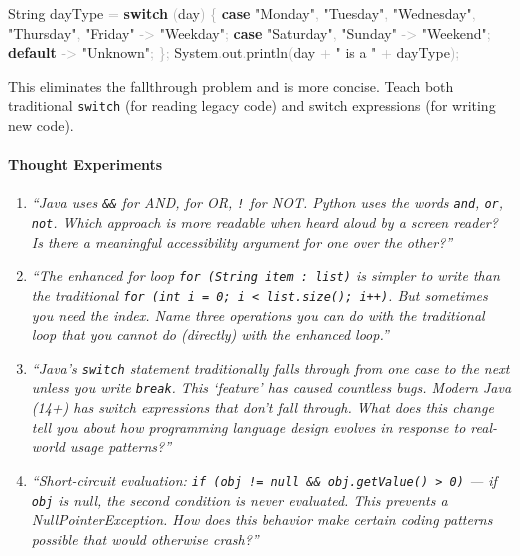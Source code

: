 \documentclass[
  justified,
  openright,
]{tufte-book}
\let\paragraph\paragraph
\newcommand{\KeywordTok}[1]{\textcolor{CodeKeyword}{\textbf{#1}}}  %
\newcommand{\StringTok}[1]{\textcolor{CodeString}{#1}}              %
\newcommand{\CodeFuncTok}[1]{\textcolor{CodeKeyword}{#1}}           %
\newcommand{\OperatorTok}[1]{\textcolor{DarkGray}{#1}}              %
\newenvironment{Shaded}{%
  \begin{mdframed}[style=TufteCode]%
}{%
  \end{mdframed}%
}
\let\paragraph\paragraph
\begin{document}
\begin{Shaded}
\begin{Highlighting}[]
String dayType \OperatorTok{=} \KeywordTok{switch} \OperatorTok{(}day\OperatorTok{)} \OperatorTok{\{}
    \KeywordTok{case} \StringTok{"Monday"}\OperatorTok{,} \StringTok{"Tuesday"}\OperatorTok{,} \StringTok{"Wednesday"}\OperatorTok{,} \StringTok{"Thursday"}\OperatorTok{,} \StringTok{"Friday"} \OperatorTok{{-}\textgreater{}} \StringTok{"Weekday"}\OperatorTok{;}
    \KeywordTok{case} \StringTok{"Saturday"}\OperatorTok{,} \StringTok{"Sunday"} \OperatorTok{{-}\textgreater{}} \StringTok{"Weekend"}\OperatorTok{;}
    \KeywordTok{default} \OperatorTok{{-}\textgreater{}} \StringTok{"Unknown"}\OperatorTok{;}
\OperatorTok{\};}
System\OperatorTok{.}\CodeFuncTok{out}\OperatorTok{.}\CodeFuncTok{println}\OperatorTok{(}day \OperatorTok{+} \StringTok{" is a "} \OperatorTok{+} dayType\OperatorTok{);}
\end{Highlighting}
\end{Shaded}

This eliminates the fallthrough problem and is more concise. Teach both
traditional \texttt{switch} (for reading legacy code) and switch
expressions (for writing new code).

\paragraph{Thought Experiments}\label{thought-experiments-34}

\begin{enumerate}
\def\labelenumi{\arabic{enumi}.}
\item
  \emph{``Java uses \texttt{\&\&} for AND, \texttt{\textbar{}\textbar{}}
  for OR, \texttt{!} for NOT. Python uses the words \texttt{and},
  \texttt{or}, \texttt{not}. Which approach is more readable when heard
  aloud by a screen reader? Is there a meaningful accessibility argument
  for one over the other?''}
\item
  \emph{``The enhanced for loop \texttt{for\ (String\ item\ :\ list)} is
  simpler to write than the traditional
  \texttt{for\ (int\ i\ =\ 0;\ i\ \textless{}\ list.size();\ i++)}. But
  sometimes you need the index. Name three operations you can do with
  the traditional loop that you cannot do (directly) with the enhanced
  loop.''}
\item
  \emph{``Java's \texttt{switch} statement traditionally falls through
  from one case to the next unless you write \texttt{break}. This
  `feature' has caused countless bugs. Modern Java (14+) has switch
  expressions that don't fall through. What does this change tell you
  about how programming language design evolves in response to
  real-world usage patterns?''}
\item
  \emph{``Short-circuit evaluation:
  \texttt{if\ (obj\ !=\ null\ \&\&\ obj.getValue()\ \textgreater{}\ 0)}
  --- if \texttt{obj} is null, the second condition is never evaluated.
  This prevents a NullPointerException. How does this behavior make
  certain coding patterns possible that would otherwise crash?''}
\end{enumerate}
\end{document}
